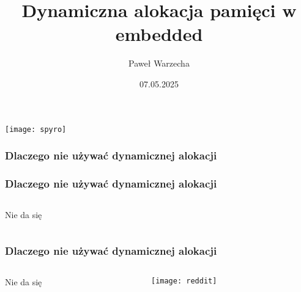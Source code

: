 \documentclass{beamer}
\title{Dynamiczna alokacja pamięci w embedded}
\author{Paweł Warzecha}
\institute{Wro.cpp}
\date{07.05.2025}
\makeatletter
\newenvironment{myitemize}{%
   \setlength{\topsep}{0pt}
   \setlength{\partopsep}{0pt}
   \renewcommand*{\@listi}{\leftmargin\leftmargini \parsep\z@ \topsep\z@ \itemsep\z@}
   \let\@listI\@listi
   \itemize
}{\enditemize}
\makeatother
\begin{document}
\begin{frame}[t]
    \texttt{[image: spyro]}\\
    \titlepage
 \end{frame}

\begin{frame}[t]
    \frametitle{Dlaczego nie używać dynamicznej alokacji}
\end{frame}
\begin{frame}[t]
    \frametitle{Dlaczego nie używać dynamicznej alokacji}
    \begin{columns}[t]
        \begin{column}[t]{0.35\textwidth}
            \begin{myitemize}
                \item Nie da się
            \end{myitemize}
        \end{column}
        \begin{column}[t]{0.7\textwidth}
        \end{column}
    \end{columns}
\end{frame}
\begin{frame}[t]
    \frametitle{Dlaczego nie używać dynamicznej alokacji}
    \begin{columns}[t]
        \begin{column}[t]{0.35\textwidth}
            \begin{myitemize}
                \item Nie da się
            \end{myitemize}
        \end{column}
        \begin{column}[t]{0.7\textwidth}
            \begin{center}
            \texttt{[image: reddit]}\\
            \tiny \cite{reddit} 
            \end{center}
        \end{column}
    \end{columns}
\end{frame}
\end{document}
